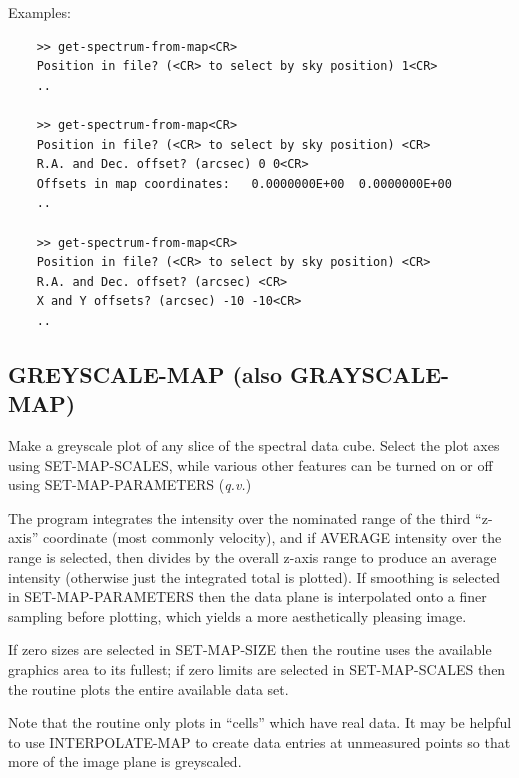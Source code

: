 \documentclass[11pt,twoside]{report}
\begin{document}
Examples:
\begin{verbatim}
    >> get-spectrum-from-map<CR>
    Position in file? (<CR> to select by sky position) 1<CR>
    ..

    >> get-spectrum-from-map<CR>
    Position in file? (<CR> to select by sky position) <CR>
    R.A. and Dec. offset? (arcsec) 0 0<CR>
    Offsets in map coordinates:   0.0000000E+00  0.0000000E+00
    ..

    >> get-spectrum-from-map<CR>
    Position in file? (<CR> to select by sky position) <CR>
    R.A. and Dec. offset? (arcsec) <CR>
    X and Y offsets? (arcsec) -10 -10<CR>
    ..
\end{verbatim}

\subsection{GREYSCALE-MAP (also GRAYSCALE-MAP)}

Make a greyscale plot of any slice  of the spectral
data cube. Select the plot axes using SET-MAP-SCALES, while various other
features can be turned on or off using SET-MAP-PARAMETERS ({\it q.v.})

The program integrates the intensity over the nominated range of the third
``z-axis'' coordinate (most commonly velocity), and if AVERAGE intensity
over the range is selected, then divides by the overall z-axis range to 
produce an average intensity (otherwise just the integrated total is plotted).
If smoothing is selected in SET-MAP-PARAMETERS then the data plane is
interpolated  onto a finer sampling before plotting,
which yields a more aesthetically pleasing image. 

If zero sizes are selected in SET-MAP-SIZE then the routine uses the
available graphics area to its fullest; if zero limits are selected in
SET-MAP-SCALES then the routine plots the entire available data set.

Note that the routine only plots in ``cells'' which have real
data. It may be helpful to use INTERPOLATE-MAP to
create data entries at unmeasured points so that more of the image plane
is greyscaled.
\end{document}
